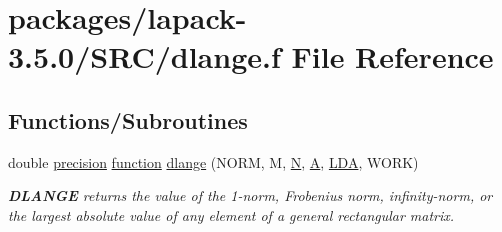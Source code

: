 \hypertarget{dlange_8f}{}\section{packages/lapack-\/3.5.0/\+S\+R\+C/dlange.f File Reference}
\label{dlange_8f}
\subsection*{Functions/\+Subroutines}
\begin{DoxyCompactItemize}
\item 
double \hyperlink{numinquire_8h_a2c8e616467665d0b2814d4c1589ba74e}{precision} \hyperlink{afunc_8m_a7b5e596df91eadea6c537c0825e894a7}{function} \hyperlink{group__doubleGEauxiliary_gaefa80dbd8cd1732740478618b8b622a1}{dlange} (N\+O\+R\+M, M, \hyperlink{polmisc_8c_a0240ac851181b84ac374872dc5434ee4}{N}, \hyperlink{classA}{A}, \hyperlink{example__user_8c_ae946da542ce0db94dced19b2ecefd1aa}{L\+D\+A}, W\+O\+R\+K)
\begin{DoxyCompactList}\small\item\em {\bfseries D\+L\+A\+N\+G\+E} returns the value of the 1-\/norm, Frobenius norm, infinity-\/norm, or the largest absolute value of any element of a general rectangular matrix. \end{DoxyCompactList}\end{DoxyCompactItemize}
